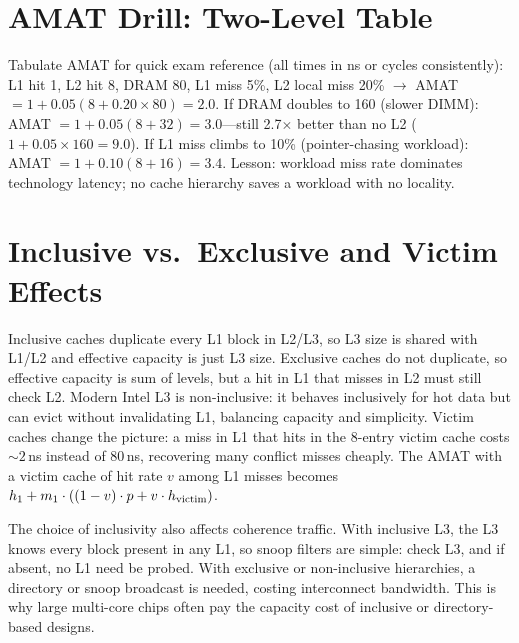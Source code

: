 \begin{center}
\end{center}
\section{AMAT Drill: Two-Level Table}
Tabulate AMAT for quick exam reference (all times in ns or cycles consistently):
L1 hit 1, L2 hit 8, DRAM 80, L1 miss 5\%, L2 local miss 20\% $\to$ AMAT $=1+0.05(8+0.20\times80)=2.0$.
If DRAM doubles to 160 (slower DIMM): AMAT $=1+0.05(8+32)=3.0$---still 2.7$\times$ better than no L2 ($1+0.05\times160=9.0$).
If L1 miss climbs to 10\% (pointer-chasing workload): AMAT $=1+0.10(8+16)=3.4$.
Lesson: workload miss rate dominates technology latency; no cache hierarchy saves a workload with no locality.

\section{Inclusive vs.\ Exclusive and Victim Effects}
Inclusive caches duplicate every L1 block in L2/L3, so L3 size is shared with L1/L2 and effective capacity is just L3 size. Exclusive caches do not duplicate, so effective capacity is sum of levels, but a hit in L1 that misses in L2 must still check L2. Modern Intel L3 is non-inclusive: it behaves inclusively for hot data but can evict without invalidating L1, balancing capacity and simplicity. Victim caches change the picture: a miss in L1 that hits in the 8-entry victim cache costs $\sim 2$\,ns instead of 80\,ns, recovering many conflict misses cheaply. The AMAT with a victim cache of hit rate $v$ among L1 misses becomes $h_1 + m_1\cdot((1-v)\cdot p + v\cdot h_{\rm victim})$.

The choice of inclusivity also affects coherence traffic. With inclusive L3, the L3 knows every block present in any L1, so snoop filters are simple: check L3, and if absent, no L1 need be probed. With exclusive or non-inclusive hierarchies, a directory or snoop broadcast is needed, costing interconnect bandwidth. This is why large multi-core chips often pay the capacity cost of inclusive or directory-based designs.

